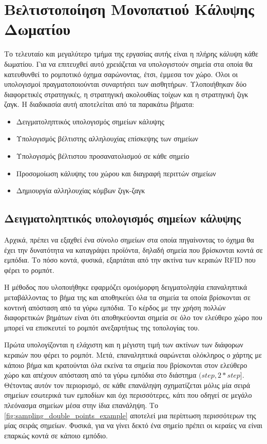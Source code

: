 \section{Βελτιστοποίηση Μονοπατιού Κάλυψης Δωματίου}
\label{section:room_path_implementation}

Το τελευταίο και μεγαλύτερο τμήμα της εργασίας αυτής είναι η πλήρης κάλυψη κάθε δωματίου. Για να επιτευχθεί αυτό χρειάζεται να υπολογιστούν σημεία στα οποία θα κατευθυνθεί το ρομποτικό όχημα σαρώνοντας, έτσι, έμμεσα τον χώρο. Όλοι οι υπολογισμοί πραγματοποιούνται συναρτήσει των αισθητήρων. Υλοποιήθηκαν δύο διαφορετικές στρατηγικές, η στρατηγική ακολουθίας τοίχων και η στρατηγική ζιγκ ζαγκ. Η διαδικασία αυτή αποτελείται από τα παρακάτω βήματα:

\begin{itemize}
    \setlength\itemsep{-0.2em}
    \item Δειγματοληπτικός υπολογισμός σημείων κάλυψης
    \item Υπολογισμός βέλτιστης αλληλουχίας επίσκεψης των σημείων
    \item Υπολογισμός βέλτιστου προσανατολισμού σε κάθε σημείο
    \item Προσομοίωση κάλυψης του χώρου και διαγραφή περιττών σημείων
    \item Δημιουργία αλληλουχίας κόμβων ζιγκ-ζαγκ
\end{itemize}

\subsection{Δειγματοληπτικός υπολογισμός σημείων κάλυψης}
\label{subsection:nodes_sampling}

Αρχικά, πρέπει να εξαχθεί ένα σύνολο σημείων στα οποία πηγαίνοντας το όχημα θα έχει την δυνατότητα να καταγράψει προϊόντα, δηλαδή σημεία που βρίσκονται κοντά σε εμπόδια. Το πόσο κοντά, φυσικά, εξαρτάται από την ακτίνα των κεραιών RFID που φέρει το ρομπότ.

Η μέθοδος που υλοποιήθηκε εφαρμόζει ομοιόμορφη δειγματοληψία επαναληπτικά μεταβάλλοντας το βήμα της και αποθηκεύει όλα τα σημεία τα οποία βρίσκονται σε κοντινή απόσταση από τα γύρω εμπόδια. Το κέρδος με την χρήση πολλών διαφορετικών βημάτων είναι ότι αποθηκεύονται σημεία σε όλο τον ελεύθερο χώρο που μπορεί να επισκευτεί το ρομπότ ανεξαρτήτως της τοπολογίας του. 

Πρώτα υπολογίζονται η ελάχιστη και η μέγιστη τιμή των ακτίνων των διάφορων κεραιών που φέρει το ρομπότ. Μετά, επαναληπτικά σαρώνεται ολόκληρος ο χάρτης με κάποιο βήμα και κρατούνται όλα εκείνα τα σημεία που βρίσκονται στον ελεύθερο χώρο και απέχουν απόσταση από τα γύρω εμπόδια στο διάστημα $(step, 2*step]$. Θέτοντας αυτόν τον περιορισμό, σε κάθε επανάληψη σχηματίζεται μόλις μία σειρά σημείων εσωτερικά των εμποδίων και όχι περισσότερες, κάτι που οδηγεί σε μεγάλο πλεόνασμα σημείων μέσα στην ίδια επανάληψη. Το \autoref{fig:sampling_double_points_example} αποτελεί μια περίπτωση περισσότερων της μίας σειράς σημείων. Φυσικά, για να γίνει δεκτό ένα σημείο πρέπει οι κεραίες να είναι επαρκώς κοντά σε κάποιο εμπόδιο.


